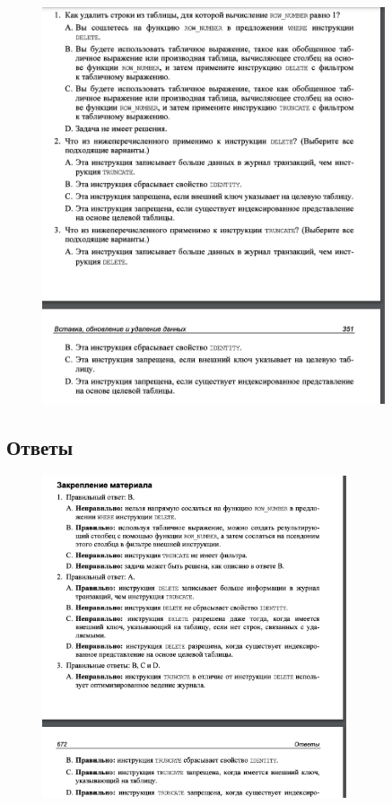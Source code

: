 \begin{figure}[h!]
	\begin{center}
		\includegraphics[width=0.9\textwidth]{img/zakrep24.png}
	\end{center}
	\captionsetup{justification=centering}
\end{figure}
\clearpage

\subsection*{Ответы}

\begin{figure}[h!]
	\begin{center}
		\includegraphics[width=0.8\textwidth]{img/ans23.png}
	\end{center}
	\captionsetup{justification=centering}
\end{figure}


